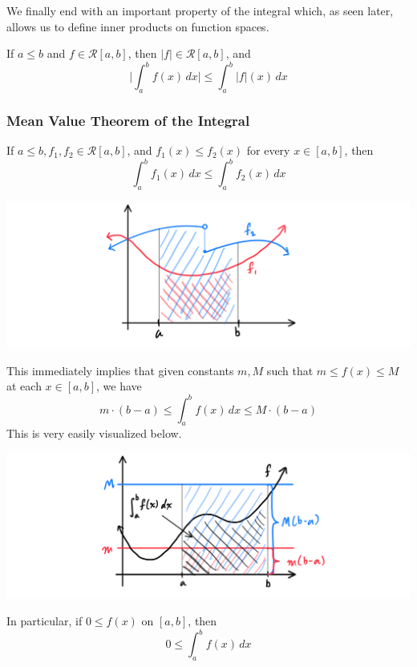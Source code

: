 \documentclass{article}
\begin{document}
      We finally end with an important property of the integral which, as seen later, allows us to define inner products on function spaces. 
      \begin{theorem}
      If $a \leq b$ and $f \in \mathcal{R}[a, b]$, then $|f| \in \mathcal{R}[a, b]$, and 
      \[\Bigg| \int_a^b f(x)\,dx \Bigg| \leq \int_a^b |f|(x)\,dx\]
      \end{theorem}

      \subsubsection{Mean Value Theorem of the Integral}

      \begin{lemma}
        If $a \leq b, f_1, f_2 \in \mathcal{R}[a, b]$, and $f_1 (x) \leq f_2 (x)$ for every $x \in [a, b]$, then
        \[\int_a^b f_1 (x)\,dx \leq \int_a^b f_2 (x)\,dx\]
        \begin{center}
            \includegraphics[scale=0.27]{img/Monotonicity_of_Integral.PNG}
        \end{center}
        This immediately implies that given constants $m, M$ such that $m \leq f(x) \leq M$ at each $x \in [a, b]$, we have
        \[m \cdot (b - a) \leq \int_a^b f(x)\,dx \leq M \cdot (b-a)\]
        This is very easily visualized below. 
        \begin{center}
            \includegraphics[scale=0.27]{img/Monotonicity_of_Intergral_2.PNG}
        \end{center}
        In particular, if $0 \leq f(x)$ on $[a, b]$, then
        \[0 \leq \int_a^b f(x)\,dx\]
      \end{lemma}
\end{document}
